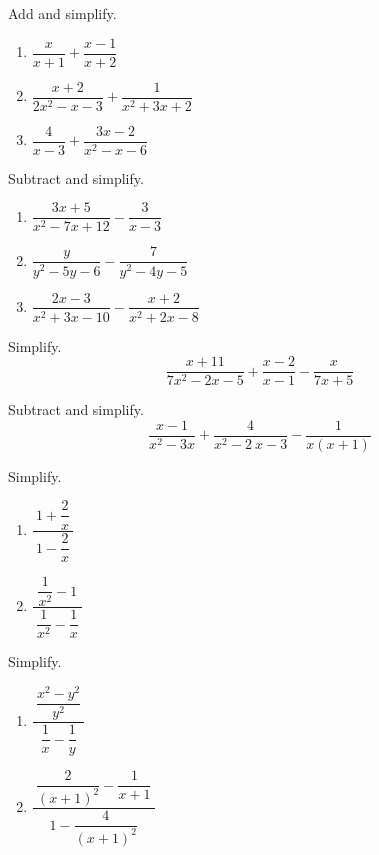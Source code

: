 \documentclass[en,12pt]{elegantbook}
\providecommand{\tightlist}{%
  \setlength{\itemsep}{0pt}\setlength{\parskip}{0pt}}
\providecommand{\tightlist}{%
  \setlength{\itemsep}{0pt}\setlength{\parskip}{0pt}}
\let\BeginKnitrBlock\begin \let\EndKnitrBlock\end
\begin{document}
\BeginKnitrBlock{exercise}
\protect\hypertarget{exr:unnamed-chunk-60}{}{\label{exr:unnamed-chunk-60} }
Add and simplify.

\begin{enumerate}
\def\labelenumi{\arabic{enumi}.}
\tightlist
\item
  \(\dfrac{x}{x+1}+\dfrac{x-1}{x+2}\)
\item
  \(\dfrac{x+2}{2x^2-x-3}+\dfrac{1}{x^2+3x+2}\)
\item
  \(\dfrac{4}{x-3}+\dfrac{3x-2}{x^2-x-6}\)
\end{enumerate}
\EndKnitrBlock{exercise}

\BeginKnitrBlock{exercise}
\protect\hypertarget{exr:unnamed-chunk-61}{}{\label{exr:unnamed-chunk-61} }
Subtract and simplify.

\begin{enumerate}
\def\labelenumi{\arabic{enumi}.}
\tightlist
\item
  \(\dfrac{3x+5}{x^2-7x+12}-\dfrac{3}{x-3}\)
\item
  \(\dfrac{y}{y^2-5y-6}-\dfrac{7}{y^2-4y-5}\)
\item
  \(\dfrac{2x-3}{x^2+3x-10}-\dfrac{x+2}{x^2+2x-8}\)
\end{enumerate}
\EndKnitrBlock{exercise}

\BeginKnitrBlock{exercise}
\protect\hypertarget{exr:unnamed-chunk-62}{}{\label{exr:unnamed-chunk-62} }
Simplify.
\[
\frac{x+11}{7x^2-2x-5}+\frac{x-2}{x-1}-\frac{x}{7x+5}
\]
\EndKnitrBlock{exercise}

\BeginKnitrBlock{exercise}
\protect\hypertarget{exr:unnamed-chunk-63}{}{\label{exr:unnamed-chunk-63} }
Subtract and simplify.
\[
\frac{x-1}{x^2-3x}+\frac{4}{x^2-2\:x-3}-\frac{1}{x\left(x+1\right)}
\]
\EndKnitrBlock{exercise}

\BeginKnitrBlock{exercise}
\protect\hypertarget{exr:unnamed-chunk-64}{}{\label{exr:unnamed-chunk-64} }
Simplify.

\begin{enumerate}
\def\labelenumi{\arabic{enumi}.}
\tightlist
\item
  \(\dfrac{~1+\dfrac{2}{x}~}{~1-\dfrac{2}{x}~}\)
\item
  \(\dfrac{~\dfrac{1}{x^2}-1~}{~\dfrac{1}{x^2}-\dfrac{1}{x}~}\)
\end{enumerate}
\EndKnitrBlock{exercise}

\BeginKnitrBlock{exercise}
\protect\hypertarget{exr:unnamed-chunk-65}{}{\label{exr:unnamed-chunk-65} }
Simplify.

\begin{enumerate}
\def\labelenumi{\arabic{enumi}.}
\tightlist
\item
  \(\dfrac{~\dfrac{x^2-y^2}{y^2}~}{~\dfrac1x-\dfrac{1}{y}~}\)
\item
  \(\dfrac{~\dfrac{2}{(x+1)^2}-\dfrac{1}{x+1}~}{~1-\dfrac{4}{(x+1)^2}~}\)
\end{enumerate}
\EndKnitrBlock{exercise}
\end{document}
